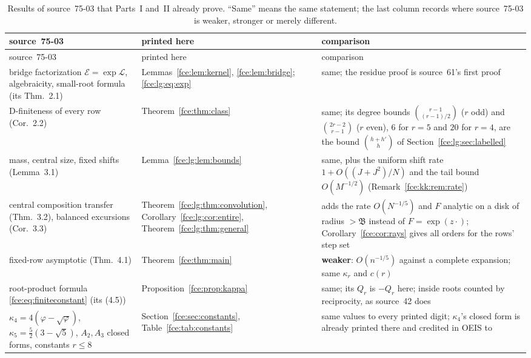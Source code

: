 \documentclass[11pt,a4paper]{article}
\numberwithin{equation}{section}
\theoremstyle{definition}\newtheorem{definition}[theorem]{Definition}
\theoremstyle{remark}\newtheorem{remark}[theorem]{Remark}
\newcommand{\E}{\mathcal E}
\newcommand{\Lcal}{\mathcal L}
\newcommand{\Bmass}{\mathfrak B}
\begin{document}
{\small
\begin{longtable}{@{}>{\raggedright\arraybackslash}p{}>{\raggedright\arraybackslash}p{}>{\raggedright\arraybackslash}p{}@{}}
\caption{Results of source~75-03 that Parts~I and~II already prove. ``Same''
means the same statement; the last column records where source~75-03 is
weaker, stronger or merely different.}\label{fce:kk:tab:overlap}\\
\toprule
source~75-03 & printed here & comparison\\
\midrule
\endfirsthead
\toprule
source~75-03 & printed here & comparison\\
\midrule
\endhead
\bottomrule
\endfoot
bridge factorization $\E=\exp\Lcal$, algebraicity, small-root formula
 (its Thm.~2.1) & Lemmas~\ref{fce:lem:kernel}, \ref{fce:lem:bridge};
 \eqref{fce:lg:eq:exp} & same; the residue proof is source~61's first proof\\
D-finiteness of every row (Cor.~2.2) & Theorem~\ref{fce:thm:class} & same;
 its degree bounds $\binom{r-1}{(r-1)/2}$ ($r$ odd) and $\binom{2r-2}{r-1}$
 ($r$ even), $6$ for $r=5$ and $20$ for $r=4$, are the bound
 $\binom{h+h'}{h}$ of Section~\ref{fce:lg:sec:labelled}\\
mass, central size, fixed shifts (Lemma~3.1) & Lemma~\ref{fce:lg:lem:bounds}
 & same, plus the uniform shift rate $1+O((J+J^2)/N)$ and the tail bound
 $O(M^{-1/2})$ (Remark~\ref{fce:kk:rem:rate})\\
central composition transfer (Thm.~3.2), balanced excursions (Cor.~3.3)
 & Theorem~\ref{fce:lg:thm:convolution}, Corollary~\ref{fce:lg:cor:entire},
 Theorem~\ref{fce:lg:thm:general} & adds the rate $O(N^{-1/5})$ and $F$
 analytic on a disk of radius $>\Bmass$ instead of $F=\exp(z\cdot)$;
 Corollary~\ref{fce:cor:rays} gives all orders for the rows' step set\\
fixed-row asymptotic (Thm.~4.1) & Theorem~\ref{fce:thm:main} &
 \textbf{weaker}: $O(n^{-1/5})$ against a complete expansion; same
 $\kappa_r$ and $c(r)$\\
root-product formula \eqref{fce:eq:finiteconstant} (its (4.5)) &
 Proposition~\ref{fce:prop:kappa} & same; its $Q_r$ is $-Q_r$ here; inside
 roots counted by reciprocity, as source~42 does\\
$\kappa_4=4(\varphi-\sqrt\varphi)$, $\kappa_5=\tfrac52(3-\sqrt5)$, $A_2,A_3$
 closed forms, constants $r\le8$ & Section~\ref{fce:sec:constants},
 Table~\ref{fce:tab:constants} & same values to every printed digit;
 $\kappa_4$'s closed form is already printed there and credited in OEIS to

\end{longtable}}
\end{document}
